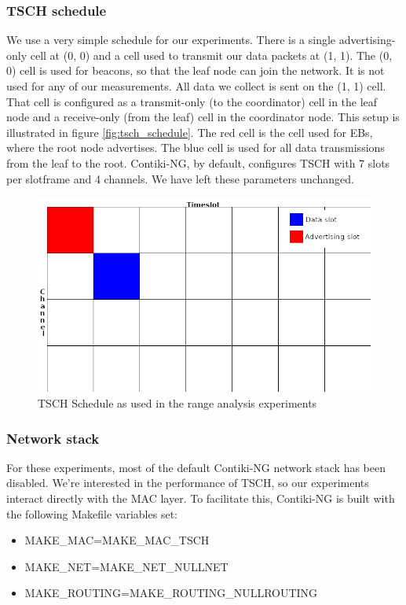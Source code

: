 \documentclass[conference]{IEEEtran}
\begin{document}
\subsubsection{TSCH schedule}
\label{section:tschschedule}

We use a very simple schedule for our experiments. There is a single advertising-only cell at (0, 0) and a cell used to transmit our data packets at (1, 1). The (0, 0) cell is used for beacons, so that the leaf node can join the network. It is not used for any of our measurements. All data we collect is sent on the (1, 1) cell. That cell is configured as a transmit-only (to the coordinator) cell in the leaf node and a receive-only (from the leaf) cell in the coordinator node. This setup is illustrated in figure \ref{fig:tsch_schedule}. The red cell is the cell used for EBs, where the root node advertises. The blue cell is used for all data transmissions from the leaf to the root. Contiki-NG, by default, configures TSCH with 7 slots per slotframe and 4 channels. We have left these parameters unchanged. 
\begin{figure}[]
	\centering
	\includegraphics[width=.4\textwidth,keepaspectratio]{tsch_schedule.png}
	\caption{TSCH Schedule as used in the range analysis experiments}
	\label{fig:6tischStack}
\end{figure}


\subsubsection{Network stack}
\label{section:netstack}

For these experiments, most of the default Contiki-NG network stack has been disabled. We're interested in the performance of TSCH, so our experiments interact directly with the MAC layer. To facilitate this, Contiki-NG is built with the following Makefile variables set: 

\begin{itemize}
\item MAKE_MAC=MAKE_MAC_TSCH
\item MAKE_NET=MAKE_NET_NULLNET
\item MAKE_ROUTING=MAKE_ROUTING_NULLROUTING
\end{itemize}
\end{document}

